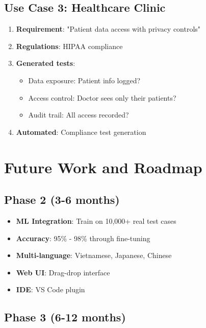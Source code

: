 \documentclass[12pt,a4paper]{report}
\begin{document}
\section{Use Case 3: Healthcare Clinic}

\begin{enumerate}
    \item \textbf{Requirement}: "Patient data access with privacy controls"
    \item \textbf{Regulations}: HIPAA compliance
    \item \textbf{Generated tests}:
    \begin{itemize}
        \item Data exposure: Patient info logged?
        \item Access control: Doctor sees only their patients?
        \item Audit trail: All access recorded?
    \end{itemize}
    \item \textbf{Automated}: Compliance test generation
\end{enumerate}

\chapter{Future Work and Roadmap}

\section{Phase 2 (3-6 months)}

\begin{itemize}
    \item \textbf{ML Integration}: Train on 10,000+ real test cases
    \item \textbf{Accuracy}: 95\% - 98\% through fine-tuning
    \item \textbf{Multi-language}: Vietnamese, Japanese, Chinese
    \item \textbf{Web UI}: Drag-drop interface
    \item \textbf{IDE}: VS Code plugin
\end{itemize}

\section{Phase 3 (6-12 months)}
\end{document}
